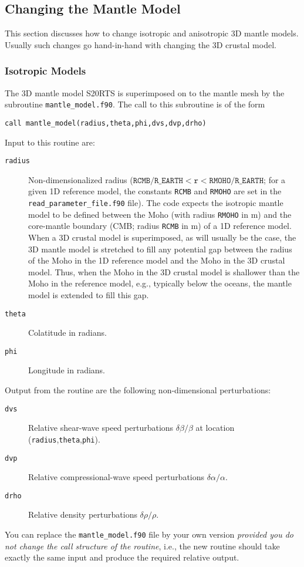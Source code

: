 \documentclass[onecolumn]{article}
\begin{document}
\subsection{Changing the Mantle Model}

This section discusses how to change isotropic and anisotropic
3D mantle models. Usually such changes go hand-in-hand with
changing the 3D crustal model.

\subsubsection{Isotropic Models}

The 3D mantle model S20RTS \cite{ritsemaetal1999} is superimposed on to
the mantle mesh by the subroutine \texttt{mantle\_model.f90}.
The call to this subroutine is of the form
\begin{verbatim}
call mantle_model(radius,theta,phi,dvs,dvp,drho)
\end{verbatim}
Input to this routine are:
\begin{description}
\item[\texttt{radius}] Non-dimensionalized radius
($\texttt{RCMB/R\_EARTH}<\texttt{r}<\texttt{RMOHO/R\_EARTH}$;
for a given 1D reference model,
the constants \texttt{RCMB} and \texttt{RMOHO} are set in the
\texttt{read\_parameter\_file.f90} file).
The code expects the isotropic mantle model to be defined between the Moho
(with radius \texttt{RMOHO} in m) and the core-mantle boundary (CMB;
radius \texttt{RCMB} in m) of a 1D reference model.
When a 3D crustal model is superimposed, as will usually
be the case, the 3D mantle model is stretched to fill any potential
gap between the radius of the Moho in the 1D reference model
and the Moho in the 3D crustal model.
Thus, when the Moho in the 3D crustal model is shallower than the Moho in
the reference model, e.g., typically below the oceans,
the mantle model is extended to fill this gap.
\item[\texttt{theta}] Colatitude in radians.
\item[\texttt{phi}] Longitude in radians.
\end{description}
Output from the routine are the following non-dimensional perturbations:
\begin{description}
\item[\texttt{dvs}] Relative shear-wave speed perturbations $\delta\beta/\beta$
at location (\texttt{radius},\texttt{theta},\texttt{phi}).
\item[\texttt{dvp}] Relative compressional-wave speed perturbations $\delta\alpha/\alpha$.
\item[\texttt{drho}] Relative density perturbations $\delta\rho/\rho$.
\end{description}
You can replace the \texttt{mantle\_model.f90} file by your own version
\textit{provided you do not change the call structure of the routine},
i.e., the new routine should take exactly the same input and
produce the required relative output.
\end{document}
